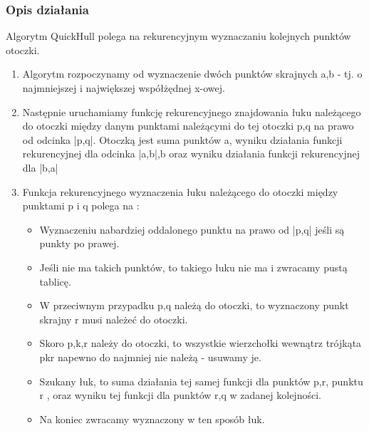 \documentclass[11pt]{article}
\theoremstyle{remark} \newtheorem{definition}{def.}
\theoremstyle{definition} \newtheorem{twierdzenie}{tw.}
\begin{document}
    \subsubsection{Opis działania}
    Algorytm QuickHull polega na rekurencyjnym wyznaczaniu kolejnych punktów otoczki. 
    \begin{enumerate}
        \item   Algorytm rozpoczynamy od wyznaczenie dwóch punktów skrajnych a,b - tj. o najmniejszej
                i największej współżędnej x-owej.
        \item   Następnie uruchamiamy funkcję rekurencyjnego znajdowania łuku należącego do otoczki
                między danym punktami należącymi do tej otoczki p,q  na prawo od odcinka |p,q|.
                Otoczką jest suma punktów a, wyniku działania funkcji rekurencyjnej dla odcinka |a,b|,b
                oraz wyniku działania funkcji rekurencyjnej dla |b,a|
        \item   Funkcja rekurencyjnego wyznaczenia łuku należącego do otoczki między punktami p i q polega na :
                \begin{itemize}
                    \item   Wyznaczeniu nabardziej oddalonego punktu na prawo od |p,q| jeśli są punkty po prawej.
                    \item   Jeśli nie ma takich punktów, to takiego łuku nie ma i zwracamy pustą tablicę. 
                    \item   W przeciwnym przypadku p,q należą do otoczki, to wyznaczony punkt skrajny r 
                            musi należeć do otoczki. 
                    \item   Skoro p,k,r należy do otoczki, to wszystkie wierzchołki wewnątrz trójkąta pkr napewno do najmniej
                            nie należą - usuwamy je.
                    \item   Szukany łuk, to suma działania tej samej funkcji dla punktów p,r, punktu r , oraz
                            wyniku tej funkcji dla punktów r,q w zadanej kolejności.
                    \item   Na koniec zwracamy wyznaczony w ten sposób łuk.
                \end{itemize}
    \end{enumerate}
\end{document}
